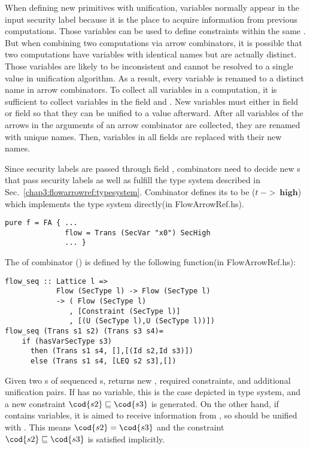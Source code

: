 When defining new primitives with unification, variables normally appear in the input security label
because it is the place to acquire information from previous computations.
Those variables can be used to define constraints within the 
same . But when combining two  computations via arrow combinators,
it is possible that two computations have variables with identical names but are actually distinct.
Those variables are likely to be inconsistent and cannot be resolved to a single value in unification 
algorithm. As a result, every variable is renamed to a distinct name in arrow combinators. 
To collect all variables in a  computation, it is sufficient to collect variables in the field
 and . New variables must either in field  or field
 so that they can be unified to a value afterward. 
After all variables of the arrows in the arguments of an arrow combinator are collected, they are renamed with
unique names. Then, variables in all fields are replaced with their new names.

Since security labels are passed through field ,
combinators need to decide new s that pass 
security labels as well as fulfill the type system described in Sec.~\ref{chap3:flowarrowref:typesystem}.
Combinator  defines its  to be ($t~->~\mathbf{high}$) which implements the type system
directly(in FlowArrowRef.hs).
\begin{verbatim}
pure f = FA { ...
              flow = Trans (SecVar "x0") SecHigh
              ... }
\end{verbatim}
The  of combinator (\arrowop{>}) is defined by the following function(in FlowArrowRef.hs):
\begin{verbatim}
flow_seq :: Lattice l => 
            Flow (SecType l) -> Flow (SecType l)
            -> ( Flow (SecType l)
               , [Constraint (SecType l)]
               , [(U (SecType l),U (SecType l))])
flow_seq (Trans s1 s2) (Trans s3 s4)=
    if (hasVarSecType s3)
      then (Trans s1 s4, [],[(Id s2,Id s3)])
      else (Trans s1 s4, [LEQ s2 s3],[])
\end{verbatim}
Given two s of sequenced s,  returns new , required 
constraints, and additional unification pairs. If  has no variable, this is 
the case depicted in type system, and a new constraint $\cod{s2}\sqsubseteq \cod{s3}$ is generated. 
On the other hand, if  contains variables, it is aimed to receive information from , so 
should be unified with . This means $\cod{s2}=\cod{s3}$ and the constraint 
$\cod{s2}\sqsubseteq \cod{s3}$ is satisfied implicitly.

